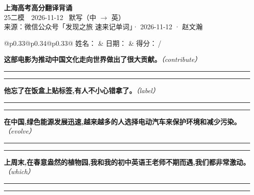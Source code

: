 \documentclass[11pt,a4paper]{article}
\newcommand{\num}[1]{\makebox[1.9em][r]{#1.}\hspace{0.3em}}
\newcommand{\wline}{\noindent\rule{\linewidth}{0.4pt}}
\newcommand{\prompt}[1]{\emph{\textcolor{tipblue}{\small（#1）}}}
\begin{document}
\pagestyle{plain}
\begin{center}
{\LARGE\bfseries 上海高考高分翻译背诵 }\\[0.25em]
{\large 25二模　2026-11-12 \quad\ 默写（中 $\to$ 英）}\\[0.35em]
{\footnotesize 来源：微信公众号「发现之旅 速来记单词」· 2026-11-12 · 赵文瀚}
\end{center}

\vspace{0.4em}
\noindent\begin{tabular}{@{}p{0.33\textwidth}@{}p{0.34\textwidth}@{}p{0.33\textwidth}@{}}
姓名：\underline{\hspace{2.0cm}} & 日期：\underline{\hspace{2.0cm}} & 得分：\underline{\hspace{1.4cm}}\,/ \\
\end{tabular}

\vspace{0.5em}

\vspace{0.8em}
\num{1}\textbf{这部电影为推动中国文化走向世界做出了很大贡献。}\prompt{contribute}

\vspace{0.3em}

\wline\vspace{0.3em}
\wline

\num{2}\textbf{他忘了在饭盒上贴标签,有人不小心错拿了。}\prompt{label}

\vspace{0.3em}

\wline\vspace{0.3em}
\wline

\num{3}\textbf{在中国,绿色能源发展迅速,越来越多的人选择电动汽车来保护环境和减少污染。}\prompt{evolve}

\vspace{0.3em}

\wline\vspace{0.3em}
\wline

\num{4}\textbf{上周末,在春意盎然的植物园,我和我的初中英语王老师不期而遇,我们都非常激动。}\prompt{which}

\vspace{0.3em}

\wline\vspace{0.3em}
\wline
\end{document}
